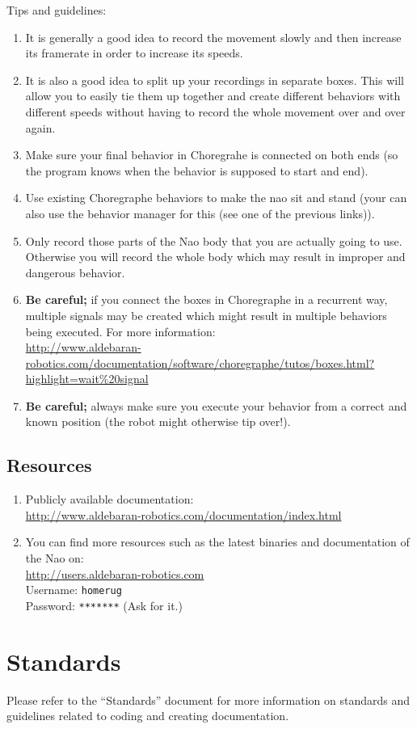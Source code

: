 \documentclass[a4paper, 10pt]{article}
\begin{document}
Tips and guidelines:
\begin{enumerate}
    \item It is generally a good idea to record the movement slowly and then increase its framerate in order to increase its speeds.
    \item It is also a good idea to split up your recordings in separate boxes. 
        This will allow you to easily tie them up together and create different behaviors with different speeds without having to record the whole movement over and over again.
    \item Make sure your final behavior in Choregrahe is connected on both ends (so the program knows when the behavior is supposed to start and end).
    \item Use existing Choregraphe behaviors to make the nao sit and stand (your can also use the behavior manager for this (see one of the previous links)).
    \item Only record those parts of the Nao body that you are actually going to use.
        Otherwise you will record the whole body which may result in improper and dangerous behavior.
    \item \textbf{Be careful;} if you connect the boxes in Choregraphe in a recurrent way, multiple signals may be created which might result in multiple behaviors being executed. 
        For more information: \\
        \url{http://www.aldebaran-robotics.com/documentation/software/choregraphe/tutos/boxes.html?highlight=wait%20signal}
    \item \textbf{Be careful;} always make sure you execute your behavior from a correct and known position (the robot might otherwise tip over!).
\end{enumerate}

\subsection{Resources}
\label{nao_resources}

\begin{enumerate}
    \item Publicly available documentation: \\
        \url{http://www.aldebaran-robotics.com/documentation/index.html}
    \item You can find more resources such as the latest binaries and documentation of the Nao on: \\
        \url{http://users.aldebaran-robotics.com} \\
        Username: \lstinline{homerug} \\
        Password: \lstinline{*******} (Ask for it.)
\end{enumerate}

\section{Standards}

Please refer to the ``Standards'' document for more information on standards and guidelines related to coding and creating documentation.
\end{document}
